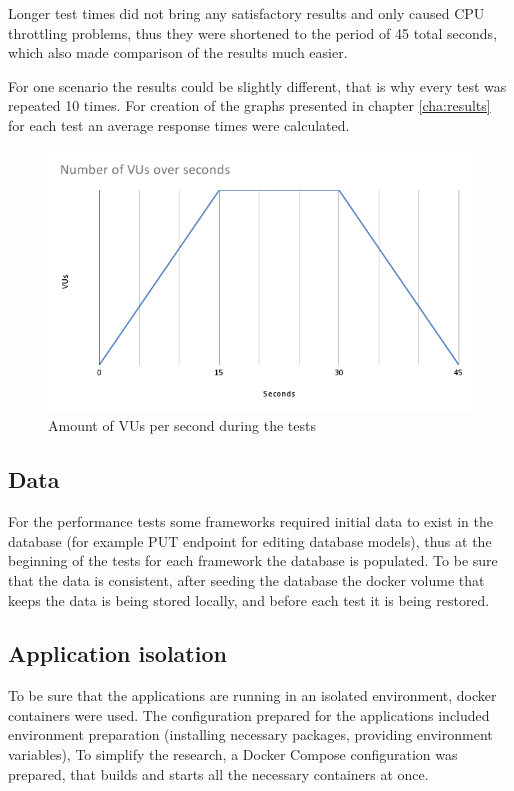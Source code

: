 Longer test times did not bring any satisfactory results and only caused CPU throttling problems, thus they were shortened to the period of 45 total seconds, which also made comparison of the results much easier.

For one scenario the results could be slightly different, that is why every test was repeated 10 times. For creation of the graphs presented in chapter \ref{cha:results} for each test an average response times were calculated.

\begin{figure}[H]
    \includegraphics[width=\columnwidth]{pictures/vusPerSecond.png}
    \caption{Amount of VUs per second during the tests}
    \label{fig:vusPerSecond}
\end{figure}


\subsection{Data}\label{sub:population}

For the performance tests some frameworks required initial data to exist in the database (for example PUT endpoint for editing database models), thus at the beginning of the tests for each framework the database is populated. To be sure that the data is consistent, after seeding the database the docker volume that keeps the data is being stored locally, and before each test it is being restored.

\subsection{Application isolation}

To be sure that the applications are running in an isolated environment, docker containers were used. The configuration prepared for the applications included environment preparation (installing necessary packages, providing environment variables), To simplify the research, a Docker Compose configuration was prepared, that builds and starts all the necessary containers at once.

